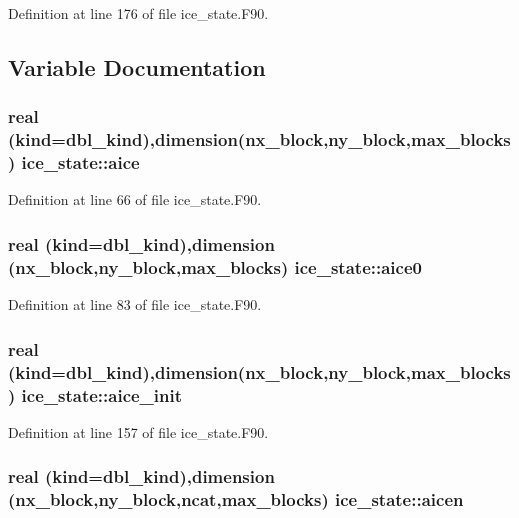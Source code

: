 Definition at line 176 of file ice\_\-state.F90.

\subsection{Variable Documentation}
\hypertarget{namespaceice__state_a91eaa8dd8287c9640310a0aec0a85df8}{
\subsubsection[{aice}]{\setlength{\rightskip}{0pt plus 5cm}real (kind=dbl\_\-kind),dimension(nx\_\-block,ny\_\-block,max\_\-blocks) {\bf ice\_\-state::aice}}}
\label{namespaceice__state_a91eaa8dd8287c9640310a0aec0a85df8}


Definition at line 66 of file ice\_\-state.F90.\hypertarget{namespaceice__state_aabb208bcf122d73e3975ab376d190703}{
\subsubsection[{aice0}]{\setlength{\rightskip}{0pt plus 5cm}real (kind=dbl\_\-kind),dimension (nx\_\-block,ny\_\-block,max\_\-blocks) {\bf ice\_\-state::aice0}}}
\label{namespaceice__state_aabb208bcf122d73e3975ab376d190703}


Definition at line 83 of file ice\_\-state.F90.\hypertarget{namespaceice__state_a02c92db0074e9bcdb95221ca85472f20}{
\subsubsection[{aice\_\-init}]{\setlength{\rightskip}{0pt plus 5cm}real (kind=dbl\_\-kind),dimension(nx\_\-block,ny\_\-block,max\_\-blocks) {\bf ice\_\-state::aice\_\-init}}}
\label{namespaceice__state_a02c92db0074e9bcdb95221ca85472f20}


Definition at line 157 of file ice\_\-state.F90.\hypertarget{namespaceice__state_a38df7a3870d9a3a425b31808503ba98e}{
\subsubsection[{aicen}]{\setlength{\rightskip}{0pt plus 5cm}real (kind=dbl\_\-kind),dimension (nx\_\-block,ny\_\-block,ncat,max\_\-blocks) {\bf ice\_\-state::aicen}}}
\label{namespaceice__state_a38df7a3870d9a3a425b31808503ba98e}



